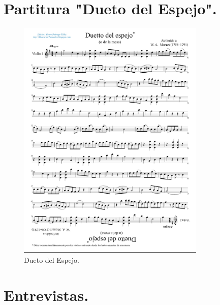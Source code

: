 \documentclass[a4paper, openright, 11pt, titlepage]{report}
\theoremstyle{definition}\newtheorem{defin}[propo]{Definition}
\theoremstyle{definition}\newtheorem{obser}[propo]{Remark}
\theoremstyle{definition}\newtheorem{ejem}[propo]{Ejemplo}
\theoremstyle{definition}\newtheorem{algoritmo}[propo]{Algoritmo}
\begin{document}
\chapter{Partitura "Dueto del Espejo".}
\begin{figure}[H]
    \centering
    \includegraphics[width = 0.8\textwidth]{duettoMozart.png}
    \caption{Dueto del Espejo.}
    \label{fig:my_label}
\end{figure}
\chapter{Entrevistas.}
\end{document}
